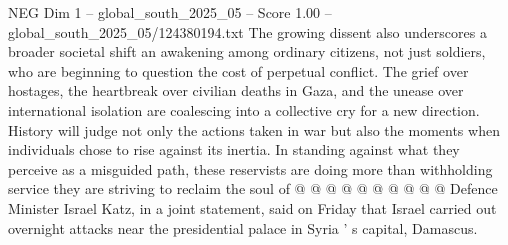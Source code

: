 \begin{textsample}{NEG Dim 1 – global\_south\_2025\_05 – Score 1.00 – global\_south\_2025\_05/124380194.txt}
The growing dissent also underscores a broader societal shift an awakening among ordinary citizens, not just soldiers, who are beginning to question the cost of perpetual conflict.
The grief over hostages, the heartbreak over civilian deaths in Gaza, and the unease over international isolation are coalescing into a collective cry for a new direction.
History will judge not only the actions taken in war but also the moments when individuals chose to rise against its inertia.
In standing against what they perceive as a misguided path, these reservists are doing more than withholding service they are striving to reclaim the soul of @ @ @ @ @ @ @ @ @ @ Defence Minister Israel Katz, in a joint statement, said on Friday that Israel carried out overnight attacks near the presidential palace in Syria ' s capital, Damascus.

\end{textsample}
